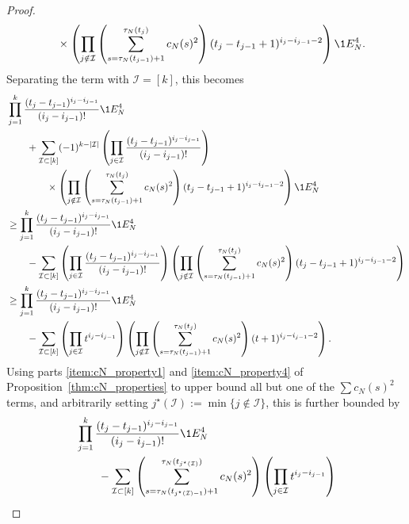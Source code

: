 \begin{proof}
\begin{align*}
    &\qquad\times \left( \prod_{j\notin\mathcal{I}} \left( 
        \sum_{s=\tau_N(t_{j-1})+1}
        ^{\tau_N(t_j)} c_N(s)^2 \right) ( t_j - t_{j-1} +1 )^{i_j - i_{j-1} -2} \right) 
        \1{E_N^4} .
\end{align*}
Separating the term with $\mathcal{I}=[k]$, this becomes
\begin{align*}
& \prod_{j=1}^k \frac{(t_j - t_{j-1})^{i_j - i_{j-1}}}{(i_j - i_{j-1})!} 
        \1{E_N^4} \notag\\
    &\qquad+ \sum_{\mathcal{I} \subset [k]} (-1)^{k-|\mathcal{I}|} 
        \left( \prod_{j\in\mathcal{I}} \frac{(t_j - t_{j-1})^{i_j - i_{j-1}}}
        {(i_j - i_{j-1})!} \right) \\
    &\qquad\qquad\times \left( \prod_{j\notin\mathcal{I}} 
        \left( \sum_{s=\tau_N(t_{j-1})+1}^{\tau_N(t_j)} c_N(s)^2 \right) 
        ( t_j - t_{j-1} +1 )^{i_j - i_{j-1} -2} \right) \1{E_N^4} \\
&\geq \prod_{j=1}^k \frac{(t_j - t_{j-1})^{i_j - i_{j-1}}}{(i_j - i_{j-1})!} 
        \1{E_N^4}  \\
    &\qquad- \sum_{\mathcal{I} \subset [k]} \left( \prod_{j\in\mathcal{I}} 
        \frac{(t_j - t_{j-1})^{i_j - i_{j-1}}}{(i_j - i_{j-1})!} \right)
        \left( \prod_{j\notin\mathcal{I}} \left( \sum_{s=\tau_N(t_{j-1})+1}
        ^{\tau_N(t_j)} c_N(s)^2 \right) ( t_j - t_{j-1} +1 )^{i_j - i_{j-1} -2} \right) 
        \notag\\
&\geq \prod_{j=1}^k \frac{(t_j - t_{j-1})^{i_j - i_{j-1}}}{(i_j - i_{j-1})!} 
        \1{E_N^4} \notag\\
    &\qquad- \sum_{\mathcal{I} \subset [k]} \left( \prod_{j\in\mathcal{I}} 
        t^{i_j - i_{j-1}} \right)
        \left( \prod_{j\notin\mathcal{I}} \left( \sum_{s=\tau_N(t_{j-1})+1}
        ^{\tau_N(t_j)} c_N(s)^2 \right) ( t+1 )^{i_j - i_{j-1} -2} \right) .
\end{align*}
Using parts \ref{item:cN_property1} and \ref{item:cN_property4} of Proposition~\ref{thm:cN_properties} to upper bound all but one of the $\sum c_N(s)^2$ terms, and arbitrarily setting 
$j^\star(\mathcal{I}) := \min\{j \notin \mathcal{I} \}$, this is further bounded by
\begin{align*}
& \prod_{j=1}^k \frac{(t_j - t_{j-1})^{i_j - i_{j-1}}}{(i_j - i_{j-1})!} 
        \1{E_N^4} \notag\\
    &\qquad- \sum_{\mathcal{I} \subset [k]} 
        \left( \sum_{s=\tau_N(t_{j^\star(\mathcal{I})-1})+1}
        ^{\tau_N(t_{j^\star(\mathcal{I})})} c_N(s)^2 \right)
        \left( \prod_{j\in\mathcal{I}} t^{i_j - i_{j-1}} \right)

\end{align*}
\end{proof}
